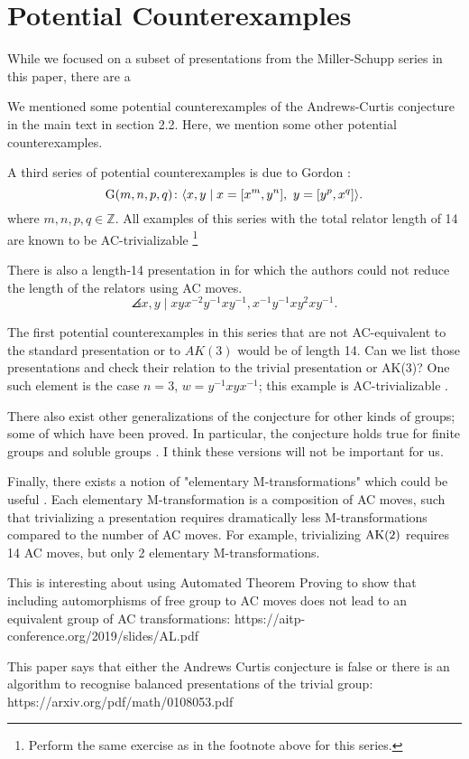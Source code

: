 
\section{Potential Counterexamples}

While we focused on a subset of presentations from the Miller-Schupp series in this paper, there are a 

We mentioned some potential counterexamples of the Andrews-Curtis conjecture in the main text in section 2.2. Here, we mention some other potential counterexamples. 

A third series of potential counterexamples is due to Gordon \cite{Brown}:
\[
\text{G}(m, n, p, q) \colon \langle x, y \mid x = [x^m, y^n],\ y = [y^p, x^q]\rangle.
\]
where $m,n,p,q \in \mathbb{Z}$.
All examples of this series with the total relator length of 14 are known
to be AC-trivializable \cite{Bowman-McCaul}
\footnote{Perform the same exercise as in the footnote above for this series.}
\newline

There is also a length-14 presentation in \cite{MMS} for which the authors could not reduce the length of the relators using AC moves.
\[
\angles{x, y \mid xyx^{-2}y^{-1} xy^{-1}, x^{-1} y^{-1} x y^2 x y^{-1}}.
\]


The first potential counterexamples in this series that are not AC-equivalent to the standard presentation or to $AK(3)$ would be of length 14.
Can we list those presentations and	check their relation to the trivial presentation or AK(3)? One such element is the case $n=3$, $w = y^{-1} x y x^{-1}$; this example is AC-trivializable \cite{morse}.

There also exist other generalizations of the conjecture for other kinds of groups; some of which have been proved.
In particular, the conjecture holds true for finite groups and soluble groups \cite{Borovik, Guyot}.
I think these versions will not be important for us.
\newline

Finally, there exists a notion of "elementary M-transformations" which could be useful \cite{BurnsI, BurnsII}.
Each elementary M-transformation is a composition of AC moves, such that trivializing a presentation requires dramatically less M-transformations compared to the number of AC moves.
For example, trivializing $\text{AK}(2)$ requires 14 AC moves, but only 2 elementary M-transformations.


 
 This is interesting about using Automated Theorem Proving to show that including automorphisms of free group to AC moves does not lead to an equivalent group of AC transformations: https://aitp-conference.org/2019/slides/AL.pdf
 
 This paper says that either the Andrews Curtis conjecture is false or there is an algorithm to recognise balanced presentations of the trivial group: https://arxiv.org/pdf/math/0108053.pdf